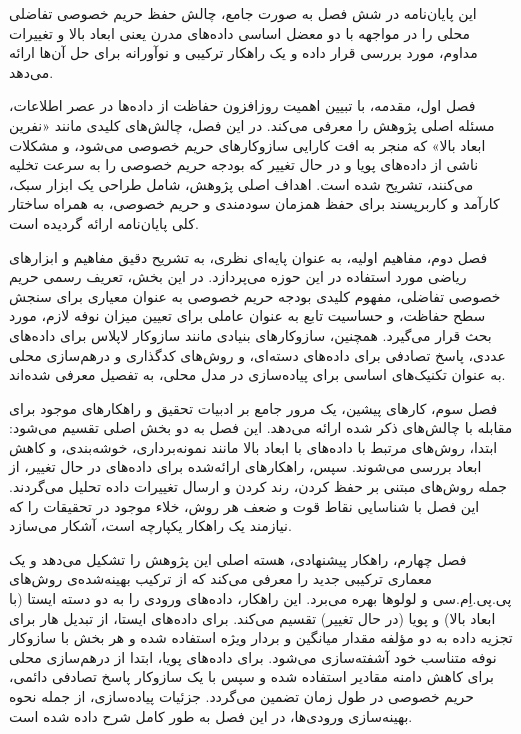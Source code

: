 

این پایان‌نامه در شش فصل به صورت جامع، چالش حفظ حریم خصوصی تفاضلی محلی را در مواجهه با دو معضل اساسی داده‌های مدرن یعنی ابعاد بالا و تغییرات مداوم، مورد بررسی قرار داده و یک راهکار ترکیبی و نوآورانه برای حل آن‌ها ارائه می‌دهد.

فصل اول، مقدمه، با تبیین اهمیت روزافزون حفاظت از داده‌ها در عصر اطلاعات، مسئله اصلی پژوهش را معرفی می‌کند. در این فصل، چالش‌های کلیدی مانند «نفرین ابعاد بالا» که منجر به افت کارایی سازوکارهای حریم خصوصی می‌شود، و مشکلات ناشی از داده‌های پویا و در حال تغییر که بودجه حریم خصوصی را به سرعت تخلیه می‌کنند، تشریح شده است. اهداف اصلی پژوهش، شامل طراحی یک ابزار سبک، کارآمد و کاربرپسند برای حفظ همزمان سودمندی و حریم خصوصی، به همراه ساختار کلی پایان‌نامه ارائه گردیده است.

فصل دوم، مفاهیم اولیه، به عنوان پایه‌ای نظری، به تشریح دقیق مفاهیم و ابزارهای ریاضی مورد استفاده در این حوزه می‌پردازد. در این بخش، تعریف رسمی حریم خصوصی تفاضلی، مفهوم کلیدی بودجه حریم خصوصی به عنوان معیاری برای سنجش سطح حفاظت، و حساسیت تابع به عنوان عاملی برای تعیین میزان نوفه لازم، مورد بحث قرار می‌گیرد. همچنین، سازوکارهای بنیادی مانند سازوکار لاپلاس برای داده‌های عددی، پاسخ تصادفی برای داده‌های دسته‌ای، و روش‌های کدگذاری و درهم‌سازی محلی به عنوان تکنیک‌های اساسی برای پیاده‌سازی در مدل محلی، به تفصیل معرفی شده‌اند.

فصل سوم، کارهای پیشین، یک مرور جامع بر ادبیات تحقیق و راهکارهای موجود برای مقابله با چالش‌های ذکر شده ارائه می‌دهد. این فصل به دو بخش اصلی تقسیم می‌شود: ابتدا، روش‌های مرتبط با داده‌های با ابعاد بالا مانند نمونه‌برداری، خوشه‌بندی، و کاهش ابعاد بررسی می‌شوند. سپس، راهکارهای ارائه‌شده برای داده‌های در حال تغییر، از جمله روش‌های مبتنی بر حفظ کردن، رند کردن و ارسال تغییرات داده تحلیل می‌گردند. این فصل با شناسایی نقاط قوت و ضعف هر روش، خلاء موجود در تحقیقات را که نیازمند یک راهکار یکپارچه است، آشکار می‌سازد.

فصل چهارم، راهکار پیشنهادی، هسته اصلی این پژوهش را تشکیل می‌دهد و یک معماری ترکیبی جدید را معرفی می‌کند که از ترکیب بهینه‌شده‌ی روش‌های پی.پی.اِم.سی و لولوها بهره می‌برد. این راهکار، داده‌های ورودی را به دو دسته ایستا (با ابعاد بالا) و پویا (در حال تغییر) تقسیم می‌کند. برای داده‌های ایستا، از تبدیل هار برای تجزیه داده به دو مؤلفه مقدار میانگین و بردار ویژه استفاده شده و هر بخش با سازوکار نوفه متناسب خود آشفته‌سازی می‌شود. برای داده‌های پویا، ابتدا از درهم‌سازی محلی برای کاهش دامنه مقادیر استفاده شده و سپس با یک سازوکار پاسخ تصادفی دائمی، حریم خصوصی در طول زمان تضمین می‌گردد. جزئیات پیاده‌سازی، از جمله نحوه بهینه‌سازی ورودی‌ها، در این فصل به طور کامل شرح داده شده است.

